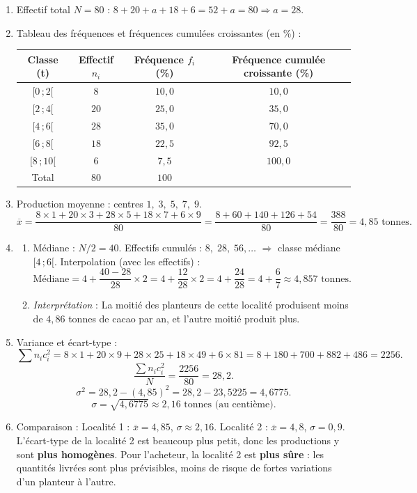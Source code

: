 \documentclass[11pt]{article}
\begin{document}
\begin{corrige}
\begin{enumerate}
\item Effectif total $N=80$ : $8+20+a+18+6=52+a=80 \Rightarrow a=28$.
\item Tableau des fréquences et fréquences cumulées croissantes (en \%) :
\begin{center}
\begin{tabular}{|c|c|c|c|}
\hline
\rowcolor{popblueL} Classe (t) & Effectif $n_i$ & Fréquence $f_i$ (\%) & Fréquence cumulée croissante (\%) \\
\hline
$[0\,;2[$ & $8$ & $10,0$ & $10,0$ \\
$[2\,;4[$ & $20$ & $25,0$ & $35,0$ \\
$[4\,;6[$ & $28$ & $35,0$ & $70,0$ \\
$[6\,;8[$ & $18$ & $22,5$ & $92,5$ \\
$[8\,;10[$ & $6$ & $7,5$ & $100,0$ \\
\hline
Total & $80$ & $100$ & \\
\hline
\end{tabular}
\end{center}
\item Production moyenne : centres $1,\;3,\;5,\;7,\;9$.
\[
\overline{x} = \frac{8\times1 + 20\times3 + 28\times5 + 18\times7 + 6\times9}{80}
= \frac{8+60+140+126+54}{80} = \frac{388}{80} = 4,85 \text{ tonnes}.
\]
\item \begin{enumerate}
\item Médiane : $N/2=40$. Effectifs cumulés : $8,\;28,\;56,\dots$ $\Rightarrow$ classe médiane $[4\,;6[$. Interpolation (avec les effectifs) :
\[
\text{Médiane} = 4 + \frac{40 - 28}{28}\times 2 = 4 + \frac{12}{28}\times 2 = 4 + \frac{24}{28} = 4 + \frac{6}{7} \approx 4,857 \text{ tonnes}.
\]
\item \emph{Interprétation} : La moitié des planteurs de cette localité produisent moins de $4,86$ tonnes de cacao par an, et l'autre moitié produit plus.
\end{enumerate}
\item Variance et écart-type :
\[
\sum n_i c_i^2 = 8\times1 + 20\times9 + 28\times25 + 18\times49 + 6\times81 = 8+180+700+882+486 = 2256.
\]
\[
\frac{\sum n_i c_i^2}{N} = \frac{2256}{80} = 28,2.
\]
\[
\sigma^2 = 28,2 - (4,85)^2 = 28,2 - 23,5225 = 4,6775.
\]
\[
\sigma = \sqrt{4,6775} \approx 2,16 \text{ tonnes (au centième)}.
\]
\item Comparaison : Localité 1 : $\overline{x}=4,85$, $\sigma\approx2,16$. Localité 2 : $\overline{x}=4,8$, $\sigma=0,9$. L'écart-type de la localité 2 est beaucoup plus petit, donc les productions y sont \textbf{plus homogènes}. Pour l'acheteur, la localité 2 est \textbf{plus sûre} : les quantités livrées sont plus prévisibles, moins de risque de fortes variations d'un planteur à l'autre.
\end{enumerate}
\end{corrige}
\end{document}
